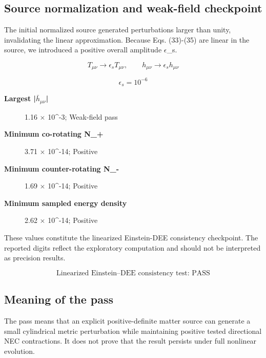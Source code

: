 \documentclass[aps,prd,preprint,nofootinbib,superscriptaddress]{revtex4-2}
\begin{document}
\subsection{Source normalization and weak-field checkpoint}

The initial normalized source generated perturbations larger than unity, invalidating the linear approximation. Because Eqs. (33)-(35) are linear in the source, we introduced a positive overall amplitude $\epsilon$\_s.


\begin{equation}
T_{\mu\nu}\rightarrow\epsilon_sT_{\mu\nu},\qquad h_{\mu\nu}\rightarrow\epsilon_sh_{\mu\nu}
\tag{36}\label{eq:36}
\end{equation}

\begin{equation}
\epsilon_s=10^{-6}
\tag{37}\label{eq:37}
\end{equation}

\begin{description}
\item[\textbf{Largest |$\bar h_{\mu\nu}$|}] 1.16 $\times$ 10\textasciicircum{}-3; Weak-field pass
\item[\textbf{Minimum co-rotating N\_+}] 3.71 $\times$ 10\textasciicircum{}-14; Positive
\item[\textbf{Minimum counter-rotating N\_-}] 1.69 $\times$ 10\textasciicircum{}-14; Positive
\item[\textbf{Minimum sampled energy density}] 2.62 $\times$ 10\textasciicircum{}-14; Positive
\end{description}

These values constitute the linearized Einstein-DEE consistency checkpoint. The reported digits reflect the exploratory computation and should not be interpreted as precision results.


\begin{equation}
\boxed{\text{Linearized Einstein--DEE consistency test: PASS}}
\tag{38}\label{eq:38}
\end{equation}

\subsection{Meaning of the pass}

The pass means that an explicit positive-definite matter source can generate a small cylindrical metric perturbation while maintaining positive tested directional NEC contractions. It does not prove that the result persists under full nonlinear evolution.
\end{document}
